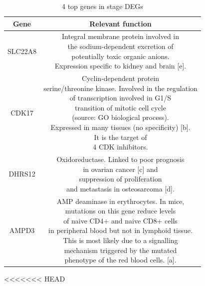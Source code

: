 \documentclass[fleqn,10pt]{SelfArx} %
\begin{document}
	\begin{table}[ht]
		\small
		\centering
		\begin{tabular}{cc}
			\hline
			Gene & Relevant function\\
			\hline
			SLC22A8 & \makecell{Integral membrane protein involved in\\the sodium-dependent excretion of\\potentially toxic organic anions.\\Expression specific to kidney and brain [e].}\\
			CDK17 & \makecell{Cyclin-dependent protein \\serine/threonine kinase. Involved in the regulation \\of transcription involved in G1/S\\transition of mitotic cell cycle\\(source: GO biological process).\\Expressed in many tissues (no specificity) [b].\\It is the target of\\4 CDK inhibitors.}\\
			DHRS12 & \makecell{Oxidoreductase. Linked to poor prognosis\\in ovarian cancer [c] and\\suppression of proliferation\\and metastasis in osteosarcoma [d].}\\
			AMPD3 & \makecell{AMP deaminase in erythrocytes. In mice,\\mutations on this gene reduce levels\\of naive CD4+ and naive CD8+ cells\\in peripheral blood but not in lymphoid tissue.\\This is most likely due to a signalling\\mechanism triggered by the mutated\\phenotype of the red blood cells. [a].}\\
			\hline
		\end{tabular}
		\caption{4 top genes in stage DEGs}
		\label{tab:deg_char}
	\end{table}

<<<<<<< HEAD
\end{document}
